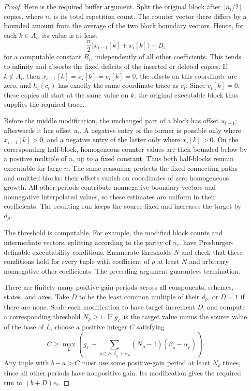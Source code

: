 \documentclass[11pt]{article}
\begin{document}
\begin{proof}
Here is the required buffer argument. Split the original block
after $\lfloor n_i/2\rfloor$ copies, where $n_i$ is its total
repetition count. The counter vector there differs by a bounded
amount from the average of the two block boundary vectors. Hence,
for each $k\in A_i$, its value is at least
\[
  \frac{n}{2}\bigl(x_{i-1}[k]+x_i[k]\bigr)-B_i
\]
for a computable constant $B_i$, independently of all other
coefficients. This tends to infinity and absorbs the fixed deficits
of the inserted or deleted copies. If $k\notin A_i$, then
$x_{i-1}[k]=x_i[k]=v_i[k]=0$, the offsets on this coordinate are
zero, and $h_i(c_i)$ has exactly the same coordinate trace as $c_i$.
Since $v_i[k]=0$, these copies all start at the same value on $k$;
the original executable block thus supplies the required trace.

Before the middle modification, the unchanged part of a block has
offset $u_{i-1}$; afterwards it has offset $u_i$. A negative entry
of the former is possible only where $x_{i-1}[k]>0$, and a negative
entry of the latter only where $x_i[k]>0$. On the corresponding
half-block, homogeneous counter values are then bounded below by
a positive multiple of $n$, up to a fixed constant. Thus both
half-blocks remain executable for large $n$. The same reasoning
protects the fixed connecting paths and omitted blocks: their
offsets vanish on coordinates of zero homogeneous growth.
All other periods contribute nonnegative boundary vectors and
nonnegative interpolated values, so these estimates are uniform
in their coefficients. The resulting run keeps the source fixed
and increases the target by $d_\rho$.

The threshold is computable. For example, the modified block counts
and intermediate vectors, splitting according to the parity of
$n_i$, have Presburger-definable executability conditions. Enumerate
thresholds $N$ and check that these conditions hold for every tuple
with coefficient of $\rho$ at least $N$ and arbitrary nonnegative
other coefficients. The preceding argument guarantees termination.

There are finitely many positive-gain periods across all components,
schemes, states, and axes. Take $D$ to be the least common multiple
of their $d_\rho$, or $D=1$ if there are none. Scale each modification
to have target increment $D$, and compute a corresponding threshold
$N_\rho\geq1$. If $g_L$ is the target value minus the source value
of the base of $L$, choose a positive integer $C$ satisfying
\[
  C\geq\max_L\left(
    g_L+\sum_{\rho\in P:\,\beta_\rho>\alpha_\rho}
      (N_\rho-1)(\beta_\rho-\alpha_\rho)
  \right).
\]
Any tuple with $b-a>C$ must use some positive-gain period at least
$N_\rho$ times, since all other periods have nonpositive gain.
Its modification gives the required run to $(b+D)e_t$.
\end{proof}
\end{document}
